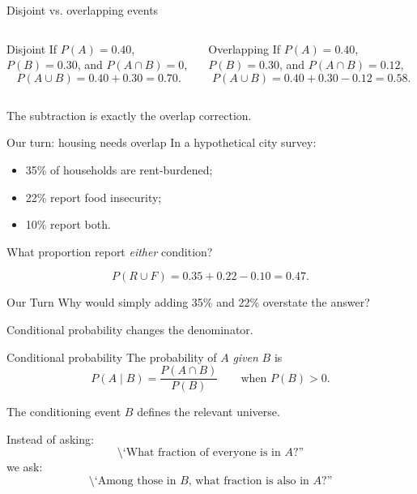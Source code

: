 \documentclass[11pt,aspectratio=169]{beamer}
\newcommand{\ourturn}[1]{%
\begin{center}
\begin{minipage}{0.90\textwidth}
\begin{block}{Our Turn}
#1
\end{block}
\end{minipage}
\end{center}}
\newcommand{\prob}[1]{P\!\left(#1\right)}
\newcommand{\condprob}[2]{P\!\left(#1\mid #2\right)}
\begin{document}
\begin{frame}{Disjoint vs. overlapping events}
\begin{columns}[T,onlytextwidth]
\begin{block}{Disjoint}
If $\prob{A}=0.40$, $\prob{B}=0.30$, and $\prob{A\cap B}=0$,
\[
\prob{A\cup B}=0.40+0.30=\boxed{0.70}.
\]
\end{block}

\begin{block}{Overlapping}
If $\prob{A}=0.40$, $\prob{B}=0.30$, and $\prob{A\cap B}=0.12$,
\[
\prob{A\cup B}=0.40+0.30-0.12=\boxed{0.58}.
\]
\end{block}
\end{columns}

\vfill
The subtraction is exactly the overlap correction.
\end{frame}

\begin{frame}{Our turn: housing needs overlap}
In a hypothetical city survey:
\begin{itemize}
  \item 35\% of households are rent-burdened;
  \item 22\% report food insecurity;
  \item 10\% report both.
\end{itemize}

What proportion report \emph{either} condition?

\[
\prob{R\cup F}=0.35+0.22-0.10=\boxed{0.47}.
\]

\vfill
\ourturn{Why would simply adding 35\% and 22\% overstate the answer?}
\end{frame}

\begin{frame}[standout]
\Large Conditional probability changes the denominator.
\end{frame}

\begin{frame}{Conditional probability}
The probability of $A$ \emph{given} $B$ is
\[
\boxed{\condprob{A}{B}=\frac{\prob{A\cap B}}{\prob{B}}}
\qquad \text{when }\prob{B}>0.
\]

The conditioning event $B$ defines the relevant universe.

\vspace{0.7em}
Instead of asking:
\[
\text{\`\`What fraction of everyone is in }A\text{?''}
\]
we ask:
\[
\text{\`\`Among those in }B\text{, what fraction is also in }A\text{?''}
\]
\end{frame}
\end{document}
